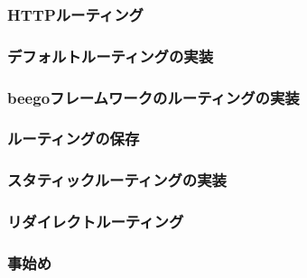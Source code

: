 \subsubsection{HTTPルーティング}

\subsubsection{デフォルトルーティングの実装}

\subsubsection{beegoフレームワークのルーティングの実装}

\subsubsection{ルーティングの保存}

\subsubsection{スタティックルーティングの実装}

\subsubsection{リダイレクトルーティング}

\subsubsection{事始め}

